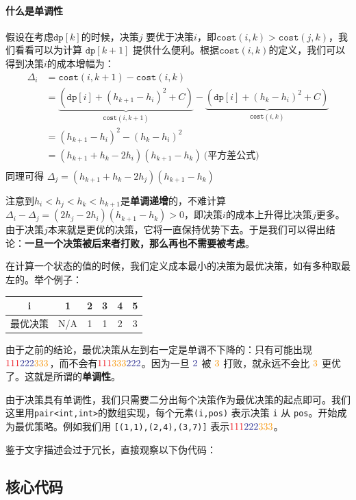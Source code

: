 \paragraph{什么是单调性}假设在考虑$\texttt{dp}[k]$的时候，决策$j$ 要优于决策$i$，即$\texttt{cost}(i,k) > \texttt{cost}(j,k)$，我们看看可以为计算 $\texttt{dp}[k+1]$ 提供什么便利。根据$\texttt{cost}(i,k)$的定义，我们可以得到决策$i$的成本增幅为：
\begin{equation*} 
\begin{split}
    \Delta_i 
    &= \texttt{cost}(i,k+1) - \texttt{cost}(i,k) \\
    &= \underbrace{(\texttt{dp}[i] + (h_{k+1} - h_i)^2+C)}_{\texttt{cost}(i,k+1)} - \underbrace{(\texttt{dp}[i] + (h_k - h_i)^2+C)}_{\texttt{cost}(i,k)}\\
    &= (h_{k+1} - h_i)^2 - (h_k - h_i)^2\\
    &= (h_{k+1} + h_k - 2h_i)(h_{k+1} - h_k) \ \textbf{(平方差公式)}\\
\end{split}
\end{equation*}
同理可得 $ \Delta_j   = (h_{k+1} + h_k - 2h_j)(h_{k+1} - h_k)$

注意到$h_i < h_j < h_k < h_{k+1}$是\textbf{单调递增}的，不难计算 $\Delta_i -  \Delta_j  = (2h_j-2h_i)(h_{k+1} - h_k) > 0$，即决策$i$的成本上升得比决策$j$更多。由于决策$j$本来就是更优的决策，它将一直保持优势下去。于是我们可以得出结论：\textbf{一旦一个决策被后来者打败，那么再也不需要被考虑}。

在计算一个状态的值的时候，我们定义成本最小的决策为最优决策，如有多种取最左的。举个例子：
\begin{center}
\begin{tabular}{ |c|c|c|c|c|c| } 
 \hline
 i & 1 &2 &3& 4& 5\\
 \hline
 最优决策 & N/A &1 &1& 2& 3\\
 \hline
\end{tabular}
\end{center}

由于之前的结论，最优决策从左到右一定是单调不下降的：只有可能出现 $\color{Red}{111}\color{Blue}{222}\color{YellowOrange}{333}$，而不会有$\color{Red}{111}\color{YellowOrange}{333}\color{Blue}{222}$。因为一旦 $\color{Blue}{2}$ 被 $\color{YellowOrange}{3}$ 打败，就永远不会比 $\color{YellowOrange}{3}$ 更优了。这就是所谓的\textbf{单调性}。

由于决策具有单调性，我们只需要二分出每个决策作为最优决策的起点即可。我们这里用\texttt{pair<int,int>}的数组实现，每个元素\texttt{(i,pos)} 表示决策 \texttt{i} 从 \texttt{pos}。开始成为最优策略。例如我们用 \texttt{[(1,1),(2,4),(3,7)]} 表示$\color{Red}{111}\color{Blue}{222}\color{YellowOrange}{333}$。


鉴于文字描述会过于冗长，直接观察以下伪代码：
\subsection*{核心代码}
\inputminted[linenos,autogobble]{python}{./Code/Z2.py}

\newpage